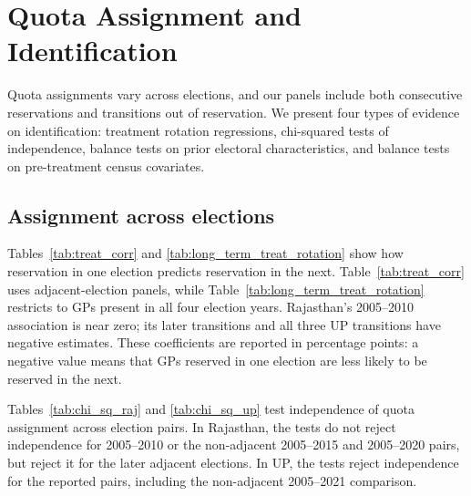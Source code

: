 \clearpage
\section{Quota Assignment and Identification}\label{sec:app_identification}
\suppressfloats[t]

Quota assignments vary across elections, and our panels include both consecutive reservations and transitions out of reservation. We present four types of evidence on identification: treatment rotation regressions, chi-squared tests of independence, balance tests on prior electoral characteristics, and balance tests on pre-treatment census covariates.

\subsection{Assignment across elections}

\begin{table}[!htbp]
    \centering
    \caption{Treatment Rotation: Quota Assignment Correlation Across Election Cycles (2-Way Panel)}
    \label{tab:treat_corr}
    
\end{table}

\begin{table}[!htbp]
    \centering
    \caption{Treatment Rotation: Quota Assignment Correlation Across Election Cycles (4-Way Panel)}
    \label{tab:long_term_treat_rotation}
    
\end{table}
\FloatBarrier

Tables~\ref{tab:treat_corr} and \ref{tab:long_term_treat_rotation} show how reservation in one election predicts reservation in the next. Table~\ref{tab:treat_corr} uses adjacent-election panels, while Table~\ref{tab:long_term_treat_rotation} restricts to GPs present in all four election years. Rajasthan's 2005--2010 association is near zero; its later transitions and all three UP transitions have negative estimates. These coefficients are reported in percentage points: a negative value means that GPs reserved in one election are less likely to be reserved in the next.

Tables~\ref{tab:chi_sq_raj} and \ref{tab:chi_sq_up} test independence of quota assignment across election pairs. In Rajasthan, the tests do not reject independence for 2005--2010 or the non-adjacent 2005--2015 and 2005--2020 pairs, but reject it for the later adjacent elections. In UP, the tests reject independence for the reported pairs, including the non-adjacent 2005--2021 comparison.

